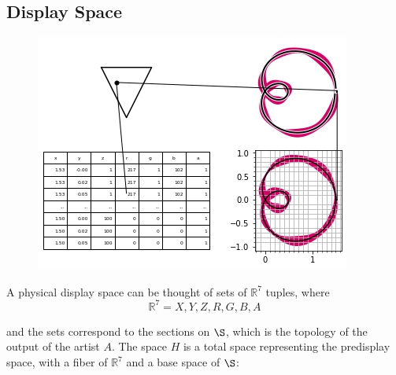 \documentclass[../intro.tex]{subfiles}
\begin{document}


\subsection{Display Space}
\begin{figure}
    \includegraphics{figures/sections/math/render.png}
    \caption{}
    \label{fig:render}
\end{figure}

A physical display space can be thought of sets of $\mathbb{R}^{7}$ tuples, where 
\begin{equation}
    \mathbb{R}^{7} = {X, Y, Z, R, G, B, A}
\end{equation}

and the sets correspond to the sections on $\S$, which is the topology of the output of the artist $A$. The space $H$ is a total space representing the predisplay space, with a fiber of $\mathbb{R}^7$ and a base space of $\S$:

\end{document}
